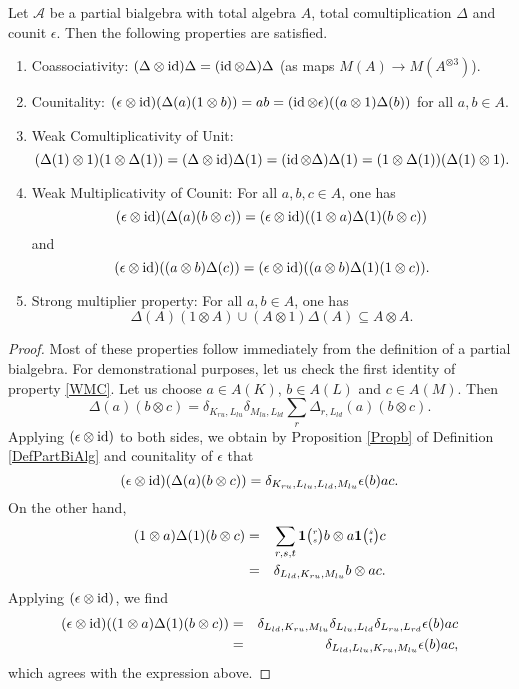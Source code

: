 \begin{Prop} Let $\mathscr{A}$ be a partial bialgebra with total algebra $A$, total comultiplication $\Delta$ and counit $\epsilon$. Then the following properties are satisfied.
\begin{enumerate}[label={(\arabic*)}]
\item Coassociativity: $(\Delta\otimes \operatorname{id})\Delta = (\operatorname{id}\otimes \Delta)\Delta$ (as maps $M(A)\rightarrow M(A^{\otimes 3})$).
\item Counitality: $(\epsilon\otimes \operatorname{id})(\Delta(a)(1\otimes b)) = ab = (\operatorname{id}\otimes \epsilon)((a\otimes 1)\Delta(b))$ for all $a,b\in A$.
\item Weak Comultiplicativity of Unit: \[(\Delta(1)\otimes 1)(1\otimes \Delta(1)) = (\Delta\otimes \operatorname{id})\Delta(1) = (\operatorname{id}\otimes \Delta)\Delta(1) = (1\otimes \Delta(1))(\Delta(1)\otimes 1).\]
\item \label{WMC} Weak Multiplicativity of Counit: For all $a,b,c\in A$, one has \[(\epsilon\otimes \operatorname{id})(\Delta(a)(b\otimes c)) = (\epsilon\otimes \operatorname{id})((1\otimes a)\Delta(1)(b\otimes c))\] and 
\[(\epsilon\otimes \operatorname{id})((a\otimes b)\Delta(c)) = (\epsilon\otimes \operatorname{id})((a\otimes b)\Delta(1)(1\otimes c)).\]
\item Strong multiplier property: For all $a,b\in A$, one has \[\Delta(A)(1\otimes A)\cup (A\otimes 1)\Delta(A)\subseteq  A\otimes A.\] 
\end{enumerate}
\end{Prop}

\begin{proof} Most of these properties follow immediately from the definition of a partial bialgebra. For demonstrational purposes, let us check the first identity of property \ref{WMC}. Let us choose $a\in A(K)$, $b\in A(L)$ and $c\in A(M)$. Then \[\Delta(a)(b\otimes c) = \delta_{K_{ru},L_{lu}}\delta_{M_{lu},L_{ld}} \sum_r \Delta_{r,L_{ld}}(a)(b\otimes c).\]  Applying $(\epsilon\otimes \operatorname{id})$ to both sides, we obtain by Proposition \ref{Propb} of Definition \ref{DefPartBiAlg} and counitality of $\epsilon$ that \[(\epsilon \otimes \operatorname{id})(\Delta(a)(b\otimes c)) = \delta_{K_{ru},L_{lu},L_{ld},M_{lu}} \epsilon(b) ac.\] On the other hand, \begin{eqnarray*} (1\otimes a)\Delta(1)(b\otimes c) &=& \sum_{r,s,t} \mathbf{1}{\tiny {\begin{pmatrix} r\\s\end{pmatrix}}} b \otimes a\mathbf{1}{\tiny {\begin{pmatrix} s\\t\end{pmatrix}}}c \\ &=& \delta_{L_{ld},K_{ru},M_{lu}} b \otimes ac.\end{eqnarray*} Applying $(\epsilon\otimes \operatorname{id})$, we find \begin{eqnarray*} (\epsilon\otimes \operatorname{id})( (1\otimes a)\Delta(1)(b\otimes c) ) &=&  \delta_{L_{ld},K_{ru},M_{lu}}\delta_{L_{lu},L_{ld}}\delta_{L_{ru},L_{rd}} \epsilon(b)ac \\ &=&  \delta_{L_{ld},L_{lu},K_{ru},M_{lu}} \epsilon(b)ac,\end{eqnarray*} which agrees with the expression above.
\end{proof} 

